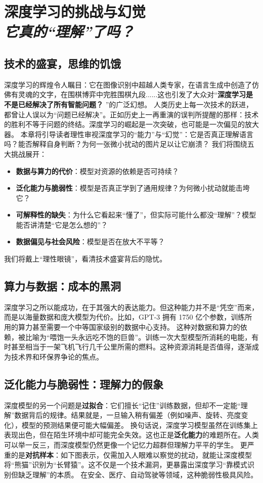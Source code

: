\chapter{ 深度学习的挑战与幻觉\\\textit{它真的“理解”了吗？}}
\section*{技术的盛宴，思维的饥饿}
深度学习的辉煌令人瞩目：它在图像识别中超越人类专家，在语言生成中创造了仿佛有灵魂的文字，在围棋博弈中完胜围棋九段......这也引发了大众对“\textbf{深度学习是不是已经解决了所有智能问题？} ”的广泛幻想。
人类历史上每一次技术的跃进，都曾让人误以为“问题已经解决”。正如历史上一再重演的误判所提醒的那样：技术的胜利不等于问题的终结。深度学习的崛起是一次突破，也可能是一次偏见的放大器。
本章将引导读者理性审视深度学习的“能力”与“幻觉”：它是否真正理解语言吗？能否解释自身判断？为何一张微小扰动的图片足以让它崩溃？
我们将围绕五大挑战展开：
\begin{itemize}
\item  \textbf{数据与算力的代价}：模型对资源的依赖是否可持续？
\item   \textbf{泛化能力与脆弱性}：模型是否真正学到了通用规律？为何微小扰动就能击垮它？
\item   \textbf{可解释性的缺失}：为什么它看起来“懂了”，但实际可能什么都没“理解”？模型能否讲清楚“它是怎么想的”？
\item  \textbf{数据偏见与社会风险}：模型是否在放大不平等？
\end{itemize}
我们将戴上“理性眼镜”，看清技术盛宴背后的隐忧。
\section*{算力与数据：成本的黑洞}
深度学习之所以能成功，在于其强大的表达能力。但这种能力并不是“凭空”而来，而是以海量数据和庞大模型为代价。比如，GPT-3 拥有 1750 亿个参数，训练所用的算力甚至需要一个中等国家级别的数据中心支持。
这种对数据和算力的依赖，被比喻为“喂饱一头永远吃不饱的巨兽”。训练一次大型模型所消耗的电能，有时甚至相当于一架飞机飞行几千公里所需的燃料。这种资源消耗是否值得，逐渐成为技术界和环保界争论的焦点。
\section*{泛化能力与脆弱性：理解力的假象}
深度模型的另一个问题是\textbf{过拟合}：它们擅长“记住”训练数据，但却不一定能“理解”数据背后的规律。结果就是，一旦输入稍有偏差（例如噪声、旋转、亮度变化），模型的预测结果便可能大幅偏差。
换句话说，深度学习模型虽然在训练集上表现出色，但在陌生环境中却可能完全失效。这也正是\textbf{泛化能力}的难题所在。人类可以举一反三，而深度模型仍然更像一个记忆力超群但理解力平平的学生。
更严重的是\textbf{对抗样本}：如下图表示，仅需加入人眼难以察觉的扰动，就能让深度模型将“熊猫”识别为“长臂猿”。这不仅是一个技术漏洞，更暴露出深度学习“靠模式识别但缺乏理解”的本质。
在安全、医疗、自动驾驶等领域，这种脆弱性极具风险。
